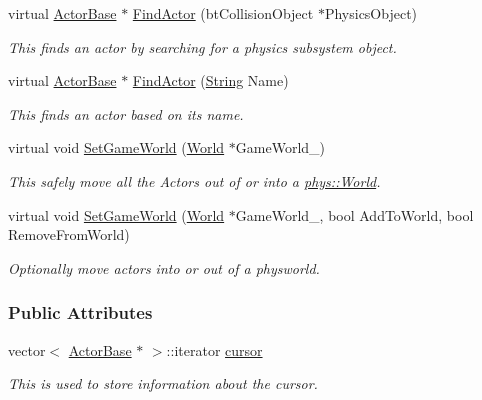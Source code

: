 \begin{DoxyCompactItemize}
virtual \hyperlink{classphys_1_1ActorBase}{ActorBase} $\ast$ \hyperlink{classphys_1_1ActorContainerVector_a5ebcdeb3018f3baf92154ddec79cd054}{FindActor} (btCollisionObject $\ast$PhysicsObject)
\begin{DoxyCompactList}\small\item\em This finds an actor by searching for a physics subsystem object. \item\end{DoxyCompactList}\item 
virtual \hyperlink{classphys_1_1ActorBase}{ActorBase} $\ast$ \hyperlink{classphys_1_1ActorContainerVector_ae04f8c6dd9b07ef9c1456707be9e155b}{FindActor} (\hyperlink{namespacephys_aa03900411993de7fbfec4789bc1d392e}{String} Name)
\begin{DoxyCompactList}\small\item\em This finds an actor based on its name. \item\end{DoxyCompactList}\item 
virtual void \hyperlink{classphys_1_1ActorContainerVector_ab4c1394254057465f7a2f89b87dc49aa}{SetGameWorld} (\hyperlink{classphys_1_1World}{World} $\ast$GameWorld\_\-)
\begin{DoxyCompactList}\small\item\em This safely move all the Actors out of or into a \hyperlink{classphys_1_1World}{phys::World}. \item\end{DoxyCompactList}\item 
virtual void \hyperlink{classphys_1_1ActorContainerVector_a721d0cde6fc4f1e8d3b33867cd5c82df}{SetGameWorld} (\hyperlink{classphys_1_1World}{World} $\ast$GameWorld\_\-, bool AddToWorld, bool RemoveFromWorld)
\begin{DoxyCompactList}\small\item\em Optionally move actors into or out of a physworld. \item\end{DoxyCompactList}\end{DoxyCompactItemize}
\subsubsection*{Public Attributes}
\begin{DoxyCompactItemize}
\item 
vector$<$ \hyperlink{classphys_1_1ActorBase}{ActorBase} $\ast$ $>$::iterator \hyperlink{classphys_1_1ActorContainerVector_a08bdad9b15e265b5d44470f21766b6ed}{cursor}
\begin{DoxyCompactList}\small\item\em This is used to store information about the cursor. \item\end{DoxyCompactList}\end{DoxyCompactItemize}


